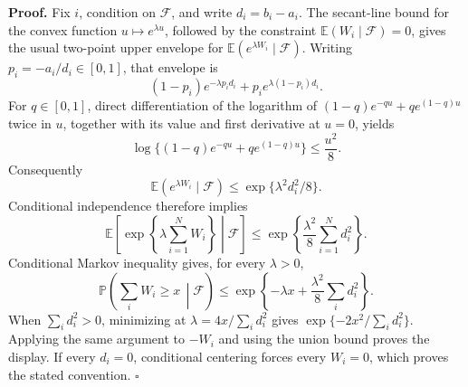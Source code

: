 \textbf{Proof.}
Fix \(i\), condition on \(\mathcal F\), and write \(d_i=b_i-a_i\). The secant-line bound for the convex function \(u\mapsto e^{\lambda u}\), followed by the constraint \(\mathbb E(W_i\mid\mathcal F)=0\), gives the usual two-point upper envelope for \(\mathbb E(e^{\lambda W_i}\mid\mathcal F)\). Writing \(p_i=-a_i/d_i\in[0,1]\), that envelope is
\[
(1-p_i)e^{-\lambda p_i d_i}+p_i e^{\lambda(1-p_i)d_i}.
\]
For \(q\in[0,1]\), direct differentiation of the logarithm of
\((1-q)e^{-qu}+q e^{(1-q)u}\) twice in \(u\), together with its value and first derivative at \(u=0\), yields
\[
\log\{(1-q)e^{-qu}+q e^{(1-q)u}\}\le \frac{u^2}{8}.
\]
Consequently
\[
\mathbb E(e^{\lambda W_i}\mid\mathcal F)\le
\exp\{\lambda^2d_i^2/8\}.
\]
Conditional independence therefore implies
\[
\mathbb E\left[\exp\left\{\lambda\sum_{i=1}^N W_i\right\}\middle|\mathcal F\right]
\le\exp\left\{\frac{\lambda^2}{8}\sum_{i=1}^Nd_i^2\right\}.
\]
Conditional Markov inequality gives, for every \(\lambda>0\),
\[
\mathbb P\left(\sum_iW_i\ge x\,\middle|\mathcal F\right)
\le\exp\left\{-\lambda x+\frac{\lambda^2}{8}\sum_i d_i^2\right\}.
\]
When \(\sum_i d_i^2>0\), minimizing at \(\lambda=4x/\sum_i d_i^2\) gives \(\exp\{-2x^2/\sum_i d_i^2\}\). Applying the same argument to \(-W_i\) and using the union bound proves the display. If every \(d_i=0\), conditional centering forces every \(W_i=0\), which proves the stated convention. \(\square\)
